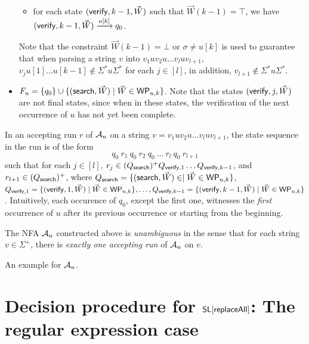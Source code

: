 \begin{itemize}
\begin{itemize}
		\item for each state $(\mathsf{verify}, k-1, \vec{W})$ such that $\vec{W}(k-1)=\top$, we have $(\mathsf{verify}, k-1, \vec{W}) \xrightarrow{u[k]} q_0$.
	\end{itemize}
	Note that the constraint $\vec{W}(k-1) = \bot$ or $\sigma \neq u[k]$ is used to guarantee that when parsing a string $v$ into $v_1 u v_2 u \dots v_{l} u v_{l+1}$, $v_j u[1] \dots u[k-1] \not \in \Sigma^\ast u \Sigma^\ast$ for each $j \in [l]$, in addition, $v_{l+1} \not \in  \Sigma^\ast u \Sigma^\ast$.
	\item $F_u=\{q_0\} \cup \{(\mathsf{search}, \vec{W}) \mid \vec{W} \in \mathsf{WP}_{u, k} \} $. Note that the states $(\mathsf{verify}, j, \vec{W})$ are not final states, since when in these states, the verification of the next occurrence of $u$ has not yet been complete.
\end{itemize}
In an accepting run $r$ of $\mathcal{A}_u$ on a string $v = v_1 u v_2 u \dots v_l u v_{l+1}$, the state sequence in the run is of the form 
$$q_0\ r_1\ q_0\ r_2\ q_0\ \dots\ r_l\ q_0\ r_{l+1}$$ 
such that  for each $j \in [l]$, $r_j \in (Q_{\mathsf{search}})^+ Q_{\mathsf{verify}, 1}  \dots  Q_{\mathsf{verify}, k-1}$, and $r_{l+1} \in (Q_{\mathsf{search}})^+$, where $Q_{\mathsf{search}}  = \{(\mathsf{search}, \vec{W}) \in \mid \vec{W} \in \mathsf{WP}_{u,k}\}$, $Q_{\mathsf{verify}, 1} = \{(\mathsf{verify}, 1, \vec{W}) \mid \vec{W} \in \mathsf{WP}_{u,k}\}, \dots, Q_{\mathsf{verify}, k-1}=\{(\mathsf{verify}, k-1, \vec{W}) \mid \vec{W} \in \mathsf{WP}_{u, k}\}$. Intuitively, each occurence of $q_0$, except the first one, witnesses the \emph{first} occurrence of $u$ after its previous occurrence or starting from the beginning.

The NFA $\mathcal{A}_u$ constructed above is \emph{unambiguous} in the sense that for each string $v \in \Sigma^+$, there is \emph{exactly one accepting run} of $\mathcal{A}_u$ on $v$.

\begin{example}
	An example for $\mathcal{A}_u$.
\end{example}


\section{Decision procedure for $\mathsf{SL}[\mathsf{replaceAll}]$: The regular expression case}

